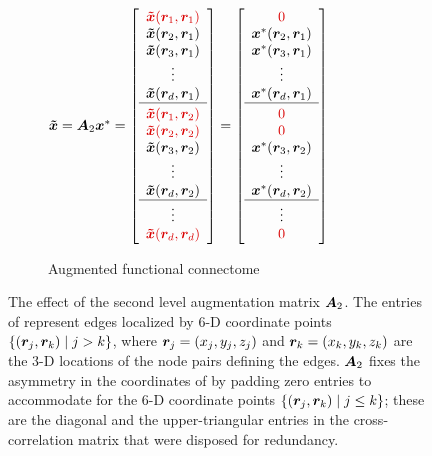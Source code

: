 \begin{figure}[t!]
\begin{subfigure}[b]{0.39\linewidth}
	\end{subfigure}
	\begin{subfigure}[b]{0.6\linewidth}
		\small\centering
		\(
\xtil=\A_2\xstar
=
\ba{c} \dored{\xtil(\r_1,\r_1)} \\ \xtil(\r_2,\r_1) \\ \xtil(\r_3,\r_1) \\ \vdots \\ \xtil(\r_{d},\r_1) \\ \hline \VSPACE \\  
\dored{\xtil(\r_1,\r_2)} \\ \dored{\xtil(\r_2,\r_2)} \\ \xtil(\r_3,\r_2) \\ \vdots \\ \xtil(\r_{d},\r_2) \\ \hline \vdots \\ \dored{\xtil(\r_{d},\r_{{d}})}  \ea
=
\ba{c} \dored{0} \\ \xstar(\r_2,\r_1) \\ \xstar(\r_3,\r_1) \\ \vdots \\ \xstar(\r_{d},\r_1) \\ \hline \VSPACE \\ \dored{0} \\ \dored{0} \\ \xstar(\r_3,\r_2) \\ \vdots \\ \xstar(\r_{d},\r_2) \\ \hline \vdots \\ \dored{0}  \ea
		\)
		\caption{Augmented functional connectome}
	\end{subfigure}
	\caption{
		The effect of the second level augmentation matrix ${\bm{A}}_2$.  
		The entries of \xstar represent edges localized by $6$-D coordinate points $\left\{({\bm{r}}_j,{\bm{r}}_k) \; |\;  j>k\right\}$, where ${\bm{r}}_j=(x_j,y_j,z_j)$ and ${\bm{r}}_k=(x_k,y_k,z_k)$ are the $3$-D locations of the node pairs defining the edges.
		${\bm{A}}_2$ fixes the asymmetry in the coordinates of \xstar by padding zero entries to accommodate for the $6$-D coordinate points $\left\{({\bm{r}}_j,{\bm{r}}_k) \; |\;  j\leq k\right\}$; these are the diagonal and the upper-triangular entries in the cross-correlation matrix that were disposed for redundancy.
	}
	\label{fig:augmat2}
\end{figure}

